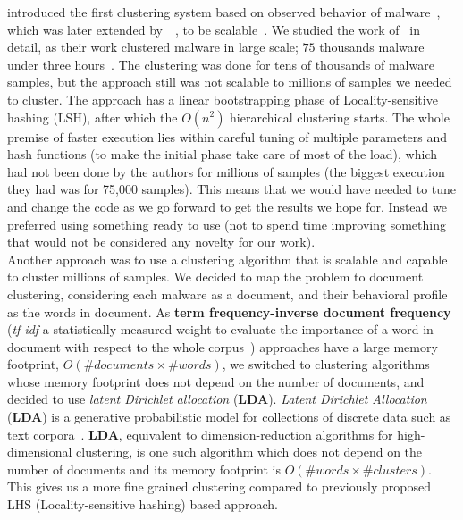 \citeauthor{bailey} introduced the first clustering system based on observed behavior of malware~\cite[]{bailey}, which was later extended by~\citeauthor{bayer}~\cite[]{bayer}, to be scalable~\cite[]{rieck2009automatic}.
We studied the work of~\citeauthor{bayer} in detail, as their work clustered malware in large scale; $75$ thousands malware under three hours~\cite[]{bayer}.
The clustering was done for tens of thousands of malware samples, but the approach still was not scalable to millions of samples we needed to cluster.
The approach has a linear bootstrapping phase of Locality-sensitive hashing (LSH), after which the $O(n^2)$ hierarchical clustering starts.
The whole premise of faster execution lies within careful tuning of multiple parameters and hash functions (to make the initial phase take care of most of the load), which had not been done by the authors for millions of samples (the biggest execution they had was for 75,000 samples).
This means that we would have needed to tune and change the code as we go forward to get the results we hope for.
Instead we preferred using something ready to use (not to spend time improving something that would not be considered any novelty for our work).
\\
Another approach was to use a clustering algorithm that is scalable and capable to cluster millions of samples.
We decided to map the problem to document clustering, considering each malware as a document, and their behavioral profile as the words in document.
As \textbf{term frequency-inverse document frequency} (\emph{tf-idf} a statistically measured weight to evaluate the importance of a word in document with respect to the whole corpus~\cite[]{tfidf}) approaches have a large memory footprint, $O(\#documents \times \#words)$, we switched to clustering algorithms whose memory footprint does not depend on the number of documents, and decided to use \textit{latent Dirichlet allocation} (\textbf{LDA}).
\textit{Latent Dirichlet Allocation} (\textbf{LDA}) is a generative probabilistic model for collections of discrete data such as text corpora~\cite[LDA]{Blei}.
\textbf{LDA}, equivalent to dimension-reduction algorithms for high-dimensional clustering, is one such algorithm which does not depend on the number of documents and its memory footprint is $O(\#words\times \#clusters)$.
This gives us a more fine grained clustering compared to previously proposed LHS (Locality-sensitive hashing) based approach.\\


